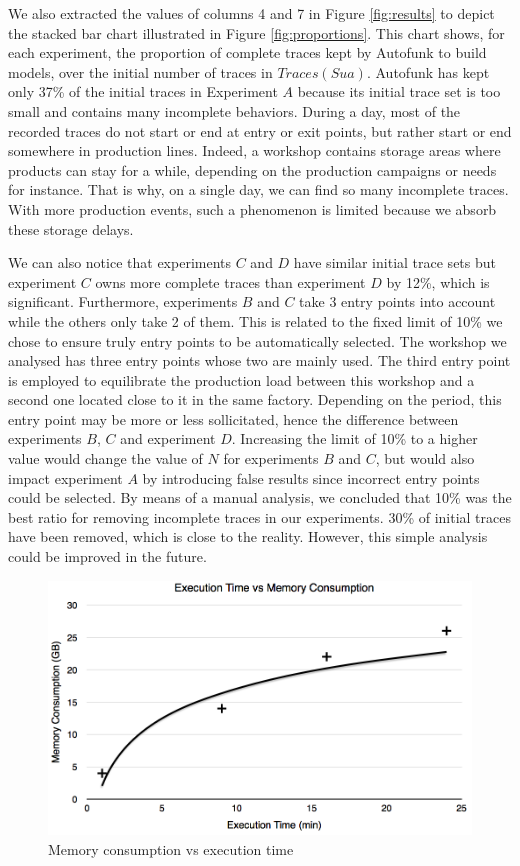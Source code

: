 We also extracted the values of columns 4 and 7 in Figure
\ref{fig:results} to depict the stacked bar chart illustrated in
Figure \ref{fig:proportions}. This chart shows, for each experiment, the
proportion of complete traces kept by Autofunk to build
models, over the initial number of traces in $Traces(Sua)$.
Autofunk has kept only 37\% of the initial traces in
Experiment $A$ because its initial trace set is too small and
contains many incomplete behaviors. During a day, most of the
recorded traces do not start or end at entry or exit points, but
rather start or end somewhere in production lines. Indeed,
a workshop contains storage areas where products can stay
for a while, depending on the production campaigns or needs for
instance. That is why, on a single day, we can find so many
incomplete traces. With more production events, such a phenomenon
is limited because we absorb these storage delays.

We can also notice that experiments $C$ and $D$ have similar
initial trace sets but experiment $C$ owns more complete traces
than experiment $D$ by 12\%, which is significant. Furthermore, experiments
$B$ and $C$ take 3 entry points into account while the others only
take 2 of them. This is related to the fixed limit of 10\% we
chose to ensure truly entry points to be automatically selected.
The workshop we analysed has three entry points whose two are
mainly used. The third entry point is employed to equilibrate the
production load between this workshop and a second one located
close to it in the same factory. Depending on the period, this
entry point may be more or less sollicitated, hence the
difference between experiments $B$, $C$ and experiment $D$.
Increasing the limit of 10\% to a higher value would change the value
of $N$ for experiments $B$ and $C$, but would also impact
experiment $A$ by introducing false results since incorrect entry
points could be selected. By means of a manual analysis, we
concluded that 10\% was the best ratio for removing incomplete
traces in our experiments. 30\% of initial traces have been
removed, which is close to the reality. However, this simple
analysis could be improved in the future.

\begin{figure}[ht]
  \includegraphics[width=0.8\linewidth]{figures/memory-time.png}

  \caption{Memory consumption vs execution time}
  \label{fig:memory-time}
\end{figure}

